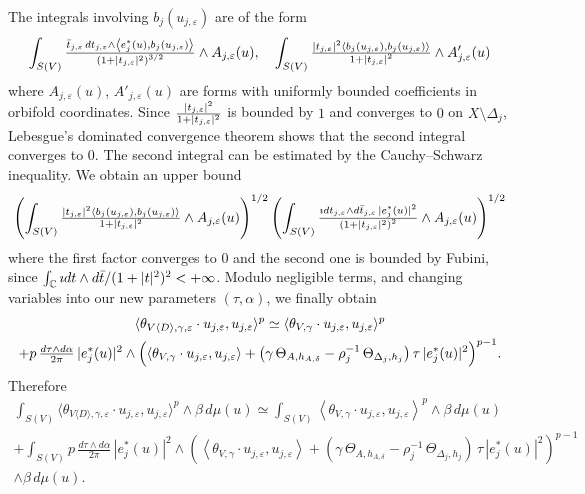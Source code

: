 \documentclass[AHL,Unicode,longabstracts,published]{cedram}
\DeclarePairedDelimiter{\abs}{\lvert}{\rvert}
\newcommand*\bC{\mathbb{C}}
\begin{document}
The integrals involving $b_j(u_{j,\varepsilon})$ are of the form
\[
\int_{S(V)}\tfrac{\bar t_{j,\varepsilon}\,dt_{j,\varepsilon}\wedge
\left\langle e_j^*(u),b_j(u_{j,\varepsilon})\right\rangle }{\left(1+\abs{t_{j,\varepsilon}}^2\right)^{3/2}}\wedge A_{j,\varepsilon}(u),\quad
\int_{S(V)}\tfrac{\left|t_{j,\varepsilon}\right|^2
\left\langle b_j\left(u_{j,\varepsilon}\right),b_j\left(u_{j,\varepsilon}\right)\right\rangle}{ 1+\left|t_{j,\varepsilon}\right|^2}\wedge A'_{j,\varepsilon}(u)
\]
where $A_{j,\varepsilon}(u)$, $A'_{j,\varepsilon}(u)$ are forms with uniformly bounded coefficients in orbifold coordinates. Since $\tfrac{\abs{t_{j,\varepsilon}}^2}{ 1+\abs{t_{j,\varepsilon}}^2}$ is bounded by $1$ and converges to $0$ on $X\setminus\Delta_j$, Lebesgue's dominated convergence theorem shows that the second integral converges to $0$. The second integral can be estimated by the Cauchy--Schwarz inequality. We obtain an upper bound
\[
\left(\int_{S(V)}\tfrac{\left|t_{j,\varepsilon}\right|^2
\langle b_j(u_{j,\varepsilon}),b_j(u_{j,\varepsilon})\rangle }{ 1+\abs{t_{j,\varepsilon}}^2}\wedge A_{j,\varepsilon}(u)\right)^{1/2}
\left(\int_{S(V)}\tfrac{\imath dt_{j,\varepsilon}\wedge d\bar t_{j,\varepsilon}\,
\abs{e_j^*(u)}^2 }{\left(1+\abs{t_{j,\varepsilon}}^2\right)^2}\wedge A_{j,\varepsilon}(u)\right)^{1/2}
\]
where the first factor converges to $0$ and the second one is bounded by Fubini, since $\int_\bC \imath dt\wedge d\bar t/(1+\abs{t}^2)^2<+\infty$. Modulo negligible terms, and changing variables into our new parameters
$(\tau,\alpha)$, we finally obtain
\begin{multline}
\langle\theta_{V\langle D\rangle,\gamma,\varepsilon}\cdot u_{j,\varepsilon}, u_{j,\varepsilon}\rangle^p
\simeq
\langle\theta_{V,\gamma}\cdot u_{j,\varepsilon},u_{j,\varepsilon}\rangle^p\\
+p\,\tfrac{d\tau\wedge d\alpha}{ 2\pi}\,\abs{e_j^*(u)}^2\wedge\Big(
\langle\theta_{V,\gamma}\cdot u_{j,\varepsilon},u_{j,\varepsilon}\rangle +\big(\gamma\,\Theta_{A,h_{A,\delta}}-\rho_j^{-1}\,\Theta_{\Delta_j,h_j}\big)
\,\tau\,\abs{e_j^*(u)}^2\Big)^{p-1}.
\end{multline}
Therefore
\begin{multline}\label{6.32}
\int_{S(V)}\langle\theta_{V\langle D\rangle,\gamma,\varepsilon}\cdot u_{j,\varepsilon}, u_{j,\varepsilon}\rangle^p\wedge\beta\,d\mu(u)
\simeq \int_{S(V)}
\left\langle\theta_{V,\gamma}\cdot u_{j,\varepsilon},u_{j,\varepsilon}\right\rangle^p
\wedge\beta\,d\mu(u)
\\
+\int_{S(V)}p\,\tfrac{d\tau\wedge d\alpha}{ 2\pi}\,\left|e_j^*(u)\right|^2\wedge\left(
\left\langle\theta_{V,\gamma}\cdot u_{j,\varepsilon},u_{j,\varepsilon}\right\rangle +\left(\gamma\,\Theta_{A,h_{A,\delta}}-\rho_j^{-1}\,\Theta_{\Delta_j,h_j}\right)
\,\tau\,\left|e_j^*(u)\right|^2\right)^{p-1}
\\
\wedge\beta\,d\mu(u).
\end{multline}
\end{document}
